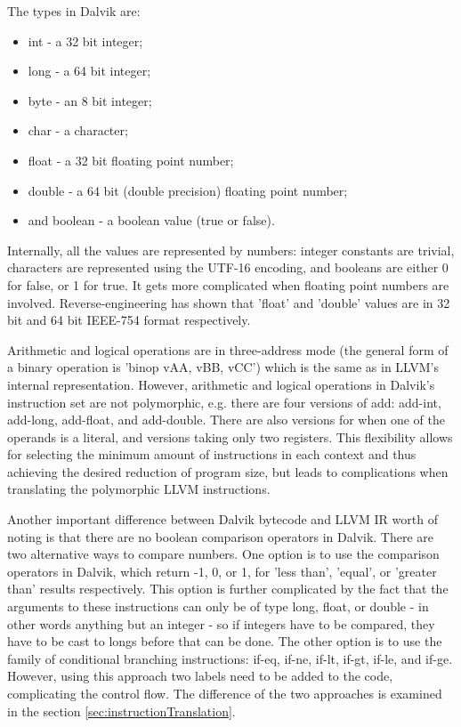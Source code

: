 \documentclass[parskip]{cs4rep}
\begin{document}
The types in Dalvik are:
\begin{itemize}
\item int - a 32 bit integer;
\item long - a 64 bit integer;
\item byte - an 8 bit integer;
\item char - a character;
\item float - a 32 bit floating point number;
\item double - a 64 bit (double precision) floating point number;
\item and boolean - a boolean value (true or false).
\end{itemize}
Internally, all the values are represented by numbers: integer constants are trivial, characters are represented using the UTF-16 encoding, and booleans are either 0 for false, or 1 for true. It gets more complicated when floating point numbers are involved. Reverse-engineering has shown that 'float' and 'double' values are in 32 bit and 64 bit IEEE-754 format respectively.

Arithmetic and logical operations are in three-address mode\cite{TheAndroidOpenSourceProject2007} (the general form of a binary operation is 'binop vAA, vBB, vCC') which is the same as in LLVM's internal representation. However, arithmetic and logical operations in Dalvik's instruction set are not polymorphic, e.g. there are four versions of add: add-int, add-long, add-float, and add-double. There are also versions for when one of the operands is a literal, and versions taking only two registers. This flexibility allows for selecting the minimum amount of instructions in each context and thus achieving the desired reduction of program size, but leads to complications when translating the polymorphic LLVM instructions.

Another important difference between Dalvik bytecode and LLVM IR worth of noting is that there are no boolean comparison operators in Dalvik. There are two alternative ways to compare numbers. One option is to use the comparison operators in Dalvik, which return -1, 0, or 1, for 'less than', 'equal', or 'greater than' results respectively. This option is further complicated by the fact that the arguments to these instructions can only be of type long, float, or double - in other words anything but an integer - so if integers have to be compared, they have to be cast to longs before that can be done. The other option is to use the family of conditional branching instructions: if-eq, if-ne, if-lt, if-gt, if-le, and if-ge. However, using this approach two labels need to be added to the code, complicating the control flow. The difference of the two approaches is examined in the section \ref{sec:instructionTranslation}.
\end{document}
